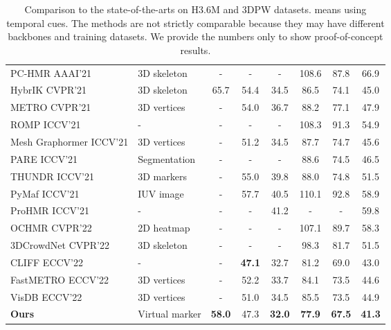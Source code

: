 \begin{table*}[ht]
{\begin{tabular}{l l | c c c | c c c}
    PC-HMR \cite{luan2021pc} AAAI'21 & 3D skeleton & - & - & - & 108.6 & 87.8 & 66.9  \\
    HybrIK \cite{li2021hybrik} CVPR'21 & 3D skeleton & 65.7 & 54.4 & 34.5 & 86.5 & 74.1 & 45.0  \\
    METRO \cite{lin2021end} CVPR'21 & 3D vertices & - & 54.0 & 36.7 & 88.2 & 77.1 & 47.9 \\
    ROMP \cite{sun2021monocular} ICCV'21 & - & - & - & - & 108.3 & 91.3 & 54.9 \\
    Mesh Graphormer\cite{Lin_2021_ICCV} ICCV'21 & 3D vertices & - & 51.2 & 34.5 & 87.7 & 74.7 & 45.6 \\
    PARE \cite{Kocabas_2021_ICCV} ICCV'21 & Segmentation & - & - & - & 88.6 & 74.5 & 46.5 \\
    THUNDR \cite{zanfir2021thundr} ICCV'21 & 3D markers & - & 55.0 & 39.8 & 88.0 & 74.8 & 51.5 \\
    PyMaf \cite{zhang2021pymaf} ICCV'21 & IUV image & - & 57.7 & 40.5 & 110.1 & 92.8 & 58.9 \\
    ProHMR \cite{Kolotouros_2021_ICCV} ICCV'21 & - & - & - & 41.2 & - & - & 59.8\\
    OCHMR \cite{Khirodkar_2022_CVPR} CVPR'22 & 2D heatmap & - & - & - & 107.1 & 89.7 & 58.3 \\
    3DCrowdNet \cite{Choi_2022_CVPR} CVPR'22 & 3D skeleton & - & - & - & 98.3 & 81.7 & 51.5 \\
    CLIFF \cite{li2022cliff} ECCV'22 & - & - & \textbf{47.1} & 32.7 & 81.2 & 69.0 & 43.0 \\
    FastMETRO \cite{cho2022FastMETRO} ECCV'22 & 3D vertices & - & 52.2 & 33.7 & 84.1 & 73.5 & 44.6 \\
    VisDB \cite{yao2022learning} ECCV'22 & 3D vertices & - & 51.0 & 34.5 & 85.5 & 73.5 & 44.9 \\

    \rowcolor{mygray}
    \textbf{Ours} & Virtual marker & \textbf{58.0} & 47.3 & \textbf{32.0} & \textbf{77.9} & \textbf{67.5} & \textbf{41.3} \\

    \hline 
\end{tabular}}
\caption{Comparison to the state-of-the-arts on H3.6M \cite{h36m_pami} and 3DPW \cite{vonMarcard2018} datasets.  means using temporal cues. The methods are not strictly comparable because they may have different backbones and training datasets. We provide the numbers only to show proof-of-concept results.}
\label{tab:state_of_the_art}
\vspace{-0.4cm}
\end{table*}


